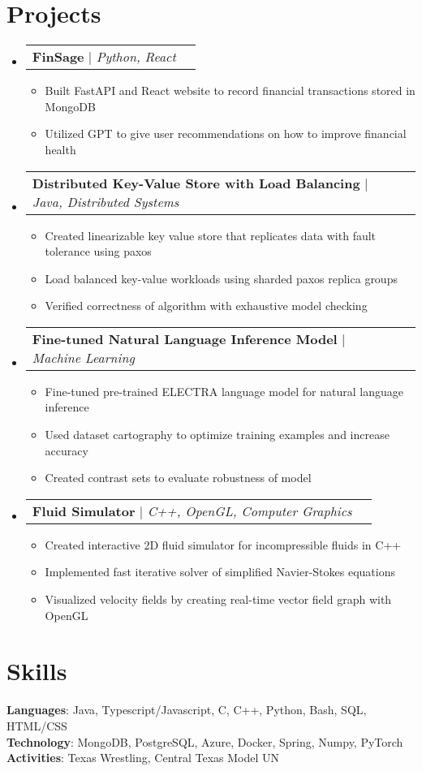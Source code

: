 \documentclass[letterpaper,11pt]{article}
\makeatletter
\newcommand{\resumeItem}[1]{
  \item\small{
    {#1 \vspace{-2pt}}
  }
}
\newcommand{\resumeProjectHeading}[2]{
    \item
    \begin{tabular*}{0.97\textwidth}{l@{\extracolsep{\fill}}r}
      \small#1 & #2 \\
    \end{tabular*}\vspace{-7pt}
}
\newcommand{\resumeSubHeadingListStart}{\begin{itemize}[leftmargin=0.15in, label={}]}
\newcommand{\resumeSubHeadingListEnd}{\end{itemize}}
\newcommand{\resumeItemListStart}{\begin{itemize}}
\newcommand{\resumeItemListEnd}{\end{itemize}\vspace{-5pt}}
\makeatother
\begin{document}
\section{Projects}
    \resumeSubHeadingListStart
      \resumeProjectHeading
          {\textbf{FinSage} $|$ \emph{Python, React}}{}
          \resumeItemListStart
            \resumeItem{Built FastAPI and React website to record financial transactions stored in MongoDB}
            \resumeItem{Utilized GPT to give user recommendations on how to improve financial health}
          \resumeItemListEnd
      \resumeProjectHeading
          {\textbf{Distributed Key-Value Store with Load Balancing} $|$ \emph{Java, Distributed Systems}}{}
          \resumeItemListStart
            \resumeItem{Created linearizable key value store that replicates data with fault tolerance using paxos}
            \resumeItem{Load balanced key-value workloads using sharded paxos replica groups}
            \resumeItem{Verified correctness of algorithm with exhaustive model checking}
          \resumeItemListEnd
      \resumeProjectHeading
          {\textbf{Fine-tuned Natural Language Inference Model} $|$ \emph{Machine Learning}}{}
          \resumeItemListStart
            \resumeItem{Fine-tuned pre-trained ELECTRA language model for natural language inference}
            \resumeItem{Used dataset cartography to optimize training examples and increase accuracy}
            \resumeItem{Created contrast sets to evaluate robustness of model}
          \resumeItemListEnd
      \resumeProjectHeading
          {\textbf{Fluid Simulator} $|$ \emph{C++, OpenGL, Computer Graphics}}{}
          \resumeItemListStart
            \resumeItem{Created interactive 2D fluid simulator for incompressible fluids in C++}
            \resumeItem{Implemented fast iterative solver of simplified Navier-Stokes equations}
            \resumeItem{Visualized velocity fields by creating real-time vector field graph with OpenGL}
          \resumeItemListEnd
    \resumeSubHeadingListEnd

%
\section{Skills}
 \begin{itemize}[leftmargin=0.15in, label={}]
    \small{\item{
     \textbf{Languages}{: Java, Typescript/Javascript, C, C++, Python, Bash, SQL, HTML/CSS} \\
     \textbf{Technology}{: MongoDB, PostgreSQL, Azure, Docker, Spring, Numpy, PyTorch} \\
     \textbf{Activities}{: Texas Wrestling, Central Texas Model UN} \\
    }}
 \end{itemize}
\end{document}
